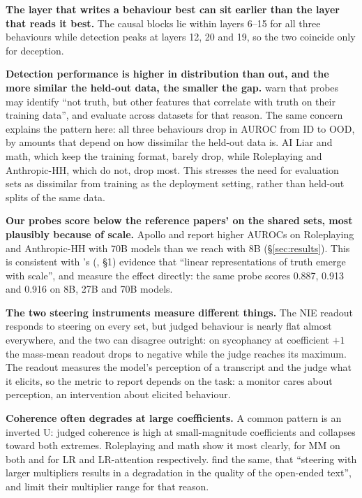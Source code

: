 \documentclass[conference]{IEEEtran}
\begin{document}
\textbf{The layer that writes a behaviour best can sit earlier than the
layer that reads it best.} The causal blocks lie within layers 6--15 for
all three behaviours while detection peaks at layers 12, 20 and 19, so
the two coincide only for deception.

\textbf{Detection performance is higher in distribution than out, and the more similar
the held-out data, the smaller the gap.} \citet[§1]{marks2024} warn that
probes may identify ``not truth, but other features that correlate with
truth on their training data'', and evaluate across datasets for that
reason. The same concern explains the pattern here: all three behaviours
drop in AUROC from ID to OOD, by amounts that depend on how dissimilar the held-out
data is. AI Liar and math, which keep the training format, barely drop,
while Roleplaying and Anthropic-HH, which do not, drop most. This stresses
the need for evaluation sets as dissimilar from training as the
deployment setting, rather than held-out splits of the same data.

\textbf{Our probes score below the reference papers' on the shared sets,
most plausibly because of scale.} Apollo and \citet{mckenzie2025}
report higher AUROCs on Roleplaying and Anthropic-HH with 70B models than
we reach with 8B (\S\ref{sec:results}). This is consistent with
\citeauthor{marks2024}'s (\citeyear{marks2024}, §1) evidence that ``linear representations of truth
emerge with scale'', and \citet{mckenzie2025} measure the effect
directly: the same probe scores 0.887, 0.913 and 0.916 on 8B, 27B and 70B
models. 

\textbf{The two steering instruments measure different things.} The NIE
readout responds to steering on every set, but judged behaviour is nearly
flat almost everywhere, and the two can disagree outright: on sycophancy
at coefficient $+1$ the mass-mean readout drops to negative while the judge
reaches its maximum. The readout measures the model's perception of a
transcript and the judge what it elicits, so the metric to report depends
on the task: a monitor cares about perception, an intervention about
elicited behaviour.

\textbf{Coherence often degrades at large coefficients.} A common pattern
is an inverted U: judged coherence is high at small-magnitude coefficients and
collapses toward both extremes. Roleplaying and math show it most clearly,
for MM on both and for LR and LR-attention
respectively. \citet[§4.2]{rimsky2024} find the same, that ``steering with
larger multipliers results in a degradation in the quality of the
open-ended text'', and limit their multiplier range for that reason.
\end{document}
